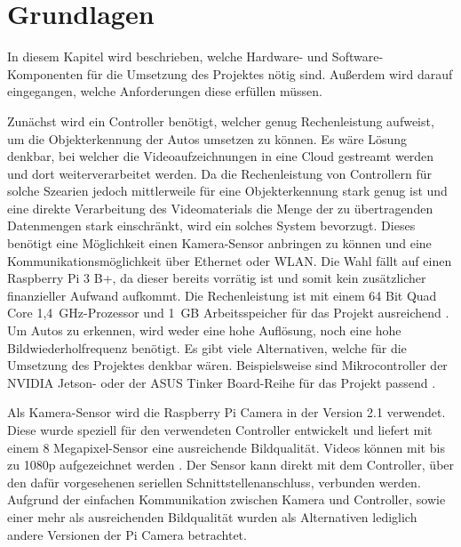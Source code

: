 \section{Grundlagen}\label{ch:Grundlagen}
In diesem Kapitel wird beschrieben, welche Hardware- und Software-Komponenten für die Umsetzung des Projektes nötig sind.
Außerdem wird darauf eingegangen, welche Anforderungen diese erfüllen müssen.

Zunächst wird ein Controller benötigt, welcher genug Rechenleistung aufweist, um die Objekterkennung der Autos umsetzen zu können.
Es wäre Lösung denkbar, bei welcher die Videoaufzeichnungen in eine Cloud gestreamt werden und dort weiterverarbeitet werden.
Da die Rechenleistung von Controllern für solche Szearien jedoch mittlerweile für eine Objekterkennung stark genug ist und eine direkte Verarbeitung des Videomaterials die Menge der zu übertragenden Datenmengen stark einschränkt, wird ein solches System bevorzugt.
Dieses benötigt eine Möglichkeit einen Kamera-Sensor anbringen zu können und eine Kommunikationsmöglichkeit über Ethernet oder WLAN.
Die Wahl fällt auf einen Raspberry Pi 3 B+, da dieser bereits vorrätig ist und somit kein zusätzlicher finanzieller Aufwand aufkommt.
Die Rechenleistung ist mit einem 64 Bit Quad Core 1,4~GHz-Prozessor und 1~GB Arbeitsspeicher für das Projekt ausreichend \cite{pi3}.
Um Autos zu erkennen, wird weder eine hohe Auflösung, noch eine hohe Bildwiederholfrequenz benötigt.
Es gibt viele Alternativen, welche für die Umsetzung des Projektes denkbar wären.
Beispielsweise sind Mikrocontroller der NVIDIA Jetson- oder der ASUS Tinker Board-Reihe für das Projekt passend \cite{jetson} \cite{tinkerBoard}.

Als Kamera-Sensor wird die Raspberry Pi Camera in der Version 2.1 verwendet.
Diese wurde speziell für den verwendeten Controller entwickelt und liefert mit einem 8 Megapixel-Sensor eine ausreichende Bildqualität.
Videos können mit bis zu 1080p aufgezeichnet werden \cite{piCAM}.
Der Sensor kann direkt mit dem Controller, über den dafür vorgesehenen seriellen Schnittstellenanschluss, verbunden werden.
Aufgrund der einfachen Kommunikation zwischen Kamera und Controller, sowie einer mehr als ausreichenden Bildqualität wurden als Alternativen lediglich andere Versionen der Pi Camera betrachtet.

